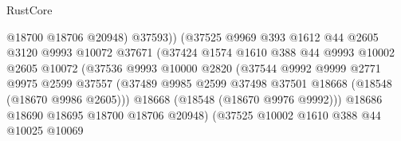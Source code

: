 \begin{lexlean}{RustCore}
\begin{coremodule}
                                        @18700
                                        @18706
                                        @20948)
                                      @37593))
                                  (@37525
                                    @9969
                                    @393
                                    @1612
                                    @44
                                    @2605
                                    @3120
                                    @9993
                                    @10072
                                    @37671
                                    (@37424
                                      @1574
                                      @1610
                                      @388
                                      @44
                                      @9993
                                      @10002
                                      @2605
                                      @10072
                                      (@37536
                                        @9993
                                        @10000
                                        @2820
                                        (@37544
                                          @9992
                                          @9999
                                          @2771
                                          @9975
                                          @2599
                                          @37557
                                          (@37489
                                            @9985
                                            @2599
                                            @37498
                                            @37501
                                            @18668
                                            (@18548 (@18670 @9986 @2605)))
                                          @18668
                                          (@18548 (@18670 @9976 @9992)))
                                        @18686
                                        @18690
                                        @18695
                                        @18700
                                        @18706
                                        @20948)
                                      (@37525
                                        @10002
                                        @1610
                                        @388
                                        @44
                                        @10025
                                        @10069

\end{coremodule}
\end{lexlean}
